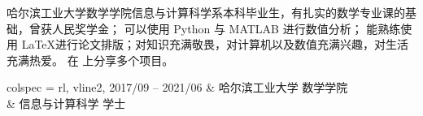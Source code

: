 \documentclass[zh]{resume}
\begin{document}
\makeheader

{\onehalfspacing\hspace{2em}%
哈尔滨工业大学数学学院信息与计算科学系本科毕业生，有扎实的数学专业课的基础，曾获人民奖学金；
可以使用 Python 与 MATLAB 进行数值分析；
能熟练使用 \LaTeX 进行论文排版；对知识充满敬畏，对计算机以及数值充满兴趣，对生活充满热爱。
在  上分享多个项目。
\par}

\begin{tblr}{
  colspec = {rl},
  vline{2},
}
  2017/09 -- 2021/06 & 哈尔滨工业大学 \textbullet 数学学院 \\
  & 信息与计算科学 \textbullet 学士
\end{tblr}

    



\end{document}
